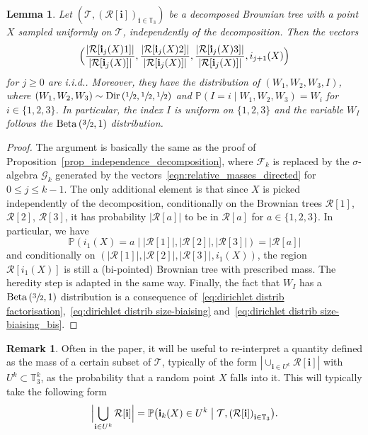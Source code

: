 \documentclass[JEP,XML,SOM,Unicode,NoFloatCountersInSection,published]{cedram}
\newcommand{\Ppsq}[2]{\mathbb{P} \left(#1\mathrel{}\middle|\mathrel{}#2\right)}
\newcommand{\bPpsq}[2]{\mathbb{P} \bigl(#1\bigm|#2\bigr)}
\newcommand{\Tt}{\mathcal{T}}
\newcommand{\Rr}{\mathcal{R}}
\newcommand{\ii}{\mathbf{i}}
\newcommand{\Dir}{\mathrm{Dir}}
\theoremstyle{plain}
\newtheorem{lemma}[theorem]{Lemma}
\theoremstyle{definition}
\newtheorem{remark}[theorem]{Remark}
\begin{document}
\begin{lemma}\label{lem_independence_pointed_decomposition}
Let $\left( \Tt, \left( \Rr[\ii] \right)_{\ii \in \mathbb{T}_3} \right)$ be a decomposed Brownian tree with a point $X$ sampled uniformly on $\Tt$, independently of the decomposition.
Then the vectors
\begin{equation}\label{eqn:relative_masses_directed}
\Bigl( \frac{\left| \Rr[\ii _j(X)1] \right|}{\left| \Rr[\ii _j(X)] \right|}, \frac{\left| \Rr[\ii _j(X)2] \right|}{\left| \Rr[\ii _j(X)] \right|}, \frac{\left| \Rr[\ii _j(X)3] \right|}{\left| \Rr[\ii _j(X)] \right|}, i_{j+1}(X) \Bigr)
\end{equation}
for $j \geq 0$ are i.i.d.. Moreover, they have the distribution of $(W_1, W_2, W_3, I)$, where $(W_1, W_2, W_3) \sim \Dir \left( \sfrac{1}{2}, \sfrac{1}{2}, \sfrac{1}{2} \right)$ and $\Ppsq{ I=i}{W_1, W_2, W_3}=W_i$ for $i \in \{1,2,3\}$. In particular, the index $I$ is uniform on $\{1,2,3\}$ and the variable $W_I$ follows the $\mathrm{Beta}\left( \sfrac{3}{2},1 \right)$ distribution.
\end{lemma}

\begin{proof}
The argument is basically the same as the proof of Proposition~\ref{prop_independence_decomposition}, where $\mathcal{F}_k$ is replaced by the $\sigma$-algebra $\mathcal{G}_k$ generated by the vectors~\eqref{eqn:relative_masses_directed} for $0 \leq j \leq k-1$.
The only additional element is that since $X$ is picked independently of the decomposition, conditionally on the Brownian trees $\Rr[1]$, $\Rr[2]$, $\Rr[3]$, it has probability $\left| \Rr[a] \right|$ to be in $\Rr[a]$ for $a \in \{1,2,3\}$.
In particular, we have
\[ \Ppsq{i_1(X)=a}{\left| \Rr[1] \right|, \left| \Rr[2] \right|, \left| \Rr[3] \right|} = |\Rr[a]| \]
and conditionally on $\left( \left| \Rr[1] \right|, \left| \Rr[2] \right|, \left| \Rr[3] \right|, i_1(X) \right)$, the region $\Rr[i_1(X)]$ is still a (bi-pointed) Brownian tree with prescribed mass. The heredity step is adapted in the same way.
Finally, the fact that $W_I$ has a $\mathrm{Beta}\left(\sfrac{3}{2},1\right)$ distribution is a consequence of~\eqref{eq:dirichlet distrib factorisation},~\eqref{eq:dirichlet distrib size-biaising} and~\eqref{eq:dirichlet distrib size-biaising_bis}.
\end{proof}
\begin{remark}\label{rem:mass in Tt as probability}
Often in the paper, it will be useful to re-interpret a quantity defined as the mass of a certain subset of $\Tt$, typically of the form $|\cup_{\ii \in U^k}\Rr[\ii]|$ with $U^k \subset \mathbb{T}_3^k$, as the probability that a random point $X$ falls into it. This will typically take the following form
\begin{align*}
\Bigl|\bigcup_{\ii \in U^k}\Rr[\ii]\Bigr| = \bPpsq{\ii_k(X)\in U^k}{\Tt, \left( \Rr[\ii] \right)_{\ii \in \mathbb{T}_3} }.
\end{align*}
\end{remark}
\end{document}
